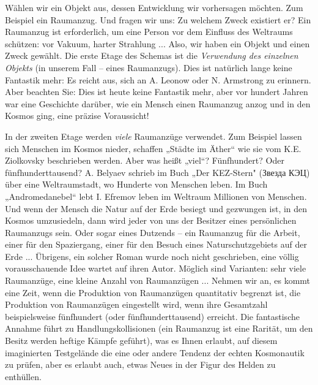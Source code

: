 \documentclass[11pt,a4paper]{article}
\begin{document}
Wählen wir ein Objekt aus, dessen Entwicklung wir vorhersagen möchten. Zum
Beispiel ein Raumanzug. Und fragen wir uns: Zu welchem Zweck existiert er?
Ein Raumanzug ist erforderlich, um eine Person vor dem Einfluss des Weltraums
schützen: vor Vakuum, harter Strahlung ... Also, wir haben ein Objekt und
einen Zweck gewählt. Die erste Etage des Schemas ist die \emph{Verwendung des
  einzelnen Objekts} (in unserem Fall -- eines Raumanzugs). Dies ist natürlich
lange keine Fantastik mehr: Es reicht aus, sich an A. Leonow oder N. Armstrong
zu erinnern. Aber beachten Sie: Dies ist heute keine Fantastik mehr, aber vor
hundert Jahren war eine Geschichte darüber, wie ein Mensch einen Raumanzug
anzog und in den Kosmos ging, eine präzise Voraussicht!

In der zweiten Etage werden \emph{viele} Raumanzüge verwendet. Zum Beispiel
lassen sich Menschen im Kosmos nieder, schaffen „Städte im Äther“ wie sie vom
K.E. Ziolkovsky beschrieben werden. Aber was heißt „viel“?  Fünfhundert? Oder
fünfhunderttausend?  A. Belyaev schrieb im Buch „Der KEZ-Stern"
(\foreignlanguage{russian}{Звезда КЭЦ}) über eine Weltraumstadt, wo Hunderte
von Menschen leben. Im Buch „Andromedanebel“ lebt I. Efremov leben im Weltraum
Millionen von Menschen. Und wenn der Mensch die Natur auf der Erde besiegt und
gezwungen ist, in den Kosmos umzusiedeln, dann wird jeder von uns der Besitzer
eines persönlichen Raumanzugs sein. Oder sogar eines Dutzends -- ein Raumanzug
für die Arbeit, einer für den Spaziergang, einer für den Besuch eines
Naturschutzgebiets auf der Erde ... Übrigens, ein solcher Roman wurde noch
nicht geschrieben, eine völlig vorausschauende Idee wartet auf ihren Autor.
Möglich sind Varianten: sehr viele Raumanzüge, eine kleine Anzahl von
Raumanzügen ... Nehmen wir an, es kommt eine Zeit, wenn die Produktion von
Raumanzügen quantitativ begrenzt ist, die Produktion von Raumanzügen
eingestellt wird, wenn ihre Gesamtzahl beispielsweise fünfhundert (oder
fünfhunderttausend) erreicht.  Die fantastische Annahme führt zu
Handlungskollisionen (ein Raumanzug ist eine Rarität, um den Besitz werden
heftige Kämpfe geführt), was es Ihnen erlaubt, auf diesem imaginierten
Testgelände die eine oder andere Tendenz der echten Kosmonautik zu prüfen,
aber es erlaubt auch, etwas Neues in der Figur des Helden zu enthüllen.
\end{document}
